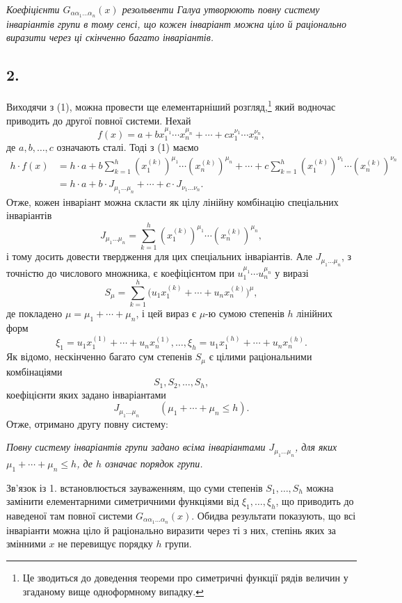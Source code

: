 \documentclass[11pt]{article}
\begin{document}
\emph{Коефіцієнти $G_{\alpha\alpha_1\ldots\alpha_n}(x)$ резольвенти Галуа утворюють повну систему інваріантів групи в тому сенсі, що кожен інваріант можна ціло й раціонально виразити через ці скінченно багато інваріантів.}

\subsection*{2.}
Виходячи з (1), можна провести ще елементарніший розгляд,\footnote{Це зводиться до доведення теореми про симетричні функції рядів величин у згаданому вище одноформному випадку.} який водночас приводить до другої повної системи. Нехай
\[
  f(x)=a+b x_1^{\mu_1}\cdots x_n^{\mu_n}
       +\cdots+c x_1^{\nu_1}\cdots x_n^{\nu_n},
\]
де $a,b,\ldots,c$ означають сталі. Тоді з (1) маємо
\[
\begin{aligned}
 h\cdot f(x)
 &=h\cdot a+b\sum_{k=1}^{h}(x_1^{(k)})^{\mu_1}\cdots(x_n^{(k)})^{\mu_n}
     +\cdots
     +c\sum_{k=1}^{h}(x_1^{(k)})^{\nu_1}\cdots(x_n^{(k)})^{\nu_n} \\
 &=h\cdot a+b\cdot J_{\mu_1\ldots\mu_n}+\cdots+c\cdot J_{\nu_1\ldots\nu_n}.
\end{aligned}
\]
Отже, кожен інваріант можна скласти як цілу лінійну комбінацію спеціальних інваріантів
\[
  J_{\mu_1\ldots\mu_n}
  =\sum_{k=1}^{h}(x_1^{(k)})^{\mu_1}\cdots(x_n^{(k)})^{\mu_n},
\]
і тому досить довести твердження для цих спеціальних інваріантів. Але $J_{\mu_1\ldots\mu_n}$, з точністю до числового множника, є коефіцієнтом при $u_1^{\mu_1}\cdots u_n^{\mu_n}$ у виразі
\[
  S_\mu=\sum_{k=1}^{h}
  \bigl(u_1x_1^{(k)}+\cdots+u_nx_n^{(k)}\bigr)^{\mu},
\]
де покладено $\mu=\mu_1+\cdots+\mu_n$, і цей вираз є $\mu$-ю сумою степенів $h$ лінійних форм
\[
  \xi_1=u_1x_1^{(1)}+\cdots+u_nx_n^{(1)},\ldots,
  \xi_h=u_1x_1^{(h)}+\cdots+u_nx_n^{(h)}.
\]
Як відомо, нескінченно багато сум степенів $S_\mu$ є цілими раціональними комбінаціями
\[
  S_1,S_2,\ldots,S_h,
\]
коефіцієнти яких задано інваріантами
\[
  J_{\mu_1\ldots\mu_n}\qquad(\mu_1+\cdots+\mu_n\le h).
\]
Отже, отримано другу повну систему:

\emph{Повну систему інваріантів групи задано всіма інваріантами $J_{\mu_1\ldots\mu_n}$, для яких $\mu_1+\cdots+\mu_n\le h$, де $h$ означає порядок групи.}

Зв'язок із 1. встановлюється зауваженням, що суми степенів $S_1,\ldots,S_h$ можна замінити елементарними симетричними функціями від $\xi_1,\ldots,\xi_h$, що приводить до наведеної там повної системи $G_{\alpha\alpha_1\ldots\alpha_n}(x)$. Обидва результати показують, що всі інваріанти можна ціло й раціонально виразити через ті з них, степінь яких за змінними $x$ не перевищує порядку $h$ групи.
\end{document}
